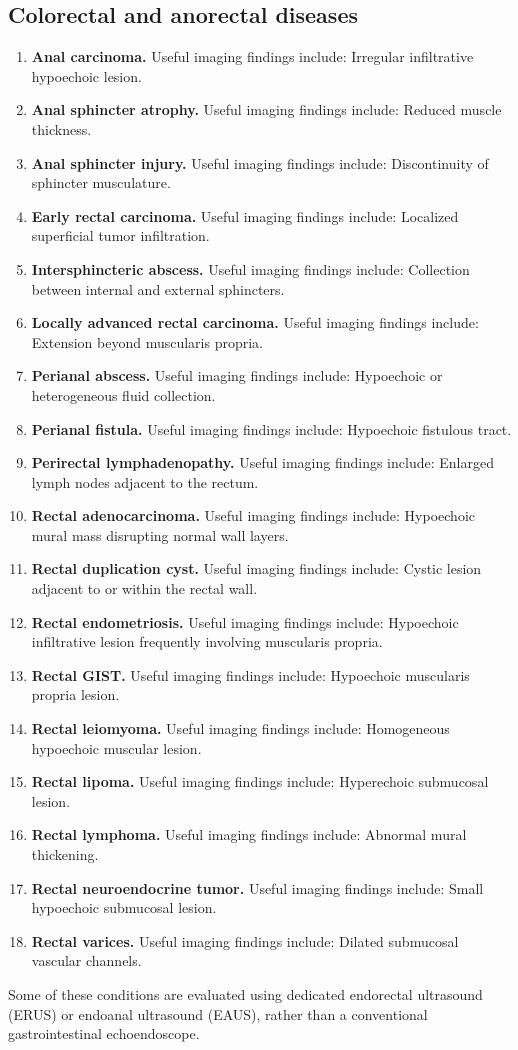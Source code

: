 \subsection{Colorectal and anorectal diseases}
\begin{enumerate}[leftmargin=*,itemsep=0.45em,topsep=0.4em]
\item \textbf{Anal carcinoma.} Useful imaging findings include: Irregular infiltrative hypoechoic lesion.
\item \textbf{Anal sphincter atrophy.} Useful imaging findings include: Reduced muscle thickness.
\item \textbf{Anal sphincter injury.} Useful imaging findings include: Discontinuity of sphincter musculature.
\item \textbf{Early rectal carcinoma.} Useful imaging findings include: Localized superficial tumor infiltration.
\item \textbf{Intersphincteric abscess.} Useful imaging findings include: Collection between internal and external sphincters.
\item \textbf{Locally advanced rectal carcinoma.} Useful imaging findings include: Extension beyond muscularis propria.
\item \textbf{Perianal abscess.} Useful imaging findings include: Hypoechoic or heterogeneous fluid collection.
\item \textbf{Perianal fistula.} Useful imaging findings include: Hypoechoic fistulous tract.
\item \textbf{Perirectal lymphadenopathy.} Useful imaging findings include: Enlarged lymph nodes adjacent to the rectum.
\item \textbf{Rectal adenocarcinoma.} Useful imaging findings include: Hypoechoic mural mass disrupting normal wall layers.
\item \textbf{Rectal duplication cyst.} Useful imaging findings include: Cystic lesion adjacent to or within the rectal wall.
\item \textbf{Rectal endometriosis.} Useful imaging findings include: Hypoechoic infiltrative lesion frequently involving muscularis propria.
\item \textbf{Rectal GIST.} Useful imaging findings include: Hypoechoic muscularis propria lesion.
\item \textbf{Rectal leiomyoma.} Useful imaging findings include: Homogeneous hypoechoic muscular lesion.
\item \textbf{Rectal lipoma.} Useful imaging findings include: Hyperechoic submucosal lesion.
\item \textbf{Rectal lymphoma.} Useful imaging findings include: Abnormal mural thickening.
\item \textbf{Rectal neuroendocrine tumor.} Useful imaging findings include: Small hypoechoic submucosal lesion.
\item \textbf{Rectal varices.} Useful imaging findings include: Dilated submucosal vascular channels.
\end{enumerate}
Some of these conditions are evaluated using dedicated endorectal ultrasound (ERUS) or endoanal ultrasound (EAUS), rather than a conventional gastrointestinal echoendoscope.

